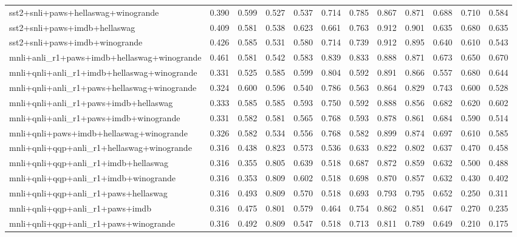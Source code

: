 \begin{table}[t]
\begin{tabular}{lrrrrrrrrrrr}
    sst2+snli+paws+hellaswag+winogrande & 0.390 & 0.599 & 0.527 & 0.537 & 0.714 & 0.785 & 0.867 & 0.871 & 0.688 & 0.710 & 0.584 \\
    sst2+snli+paws+imdb+hellaswag & 0.409 & 0.581 & 0.538 & 0.623 & 0.661 & 0.763 & 0.912 & 0.901 & 0.635 & 0.680 & 0.635 \\
    sst2+snli+paws+imdb+winogrande & 0.426 & 0.585 & 0.531 & 0.580 & 0.714 & 0.739 & 0.912 & 0.895 & 0.640 & 0.610 & 0.543 \\
    \addlinespace
    mnli+anli\_r1+paws+imdb+hellaswag+winogrande & 0.461 & 0.581 & 0.542 & 0.583 & 0.839 & 0.833 & 0.888 & 0.871 & 0.673 & 0.650 & 0.670 \\
    mnli+qnli+anli\_r1+imdb+hellaswag+winogrande & 0.331 & 0.525 & 0.585 & 0.599 & 0.804 & 0.592 & 0.891 & 0.866 & 0.557 & 0.680 & 0.644 \\
    mnli+qnli+anli\_r1+paws+hellaswag+winogrande & 0.324 & 0.600 & 0.596 & 0.540 & 0.786 & 0.563 & 0.864 & 0.829 & 0.743 & 0.600 & 0.528 \\
    mnli+qnli+anli\_r1+paws+imdb+hellaswag & 0.333 & 0.585 & 0.585 & 0.593 & 0.750 & 0.592 & 0.888 & 0.856 & 0.682 & 0.620 & 0.602 \\
    mnli+qnli+anli\_r1+paws+imdb+winogrande & 0.331 & 0.582 & 0.581 & 0.565 & 0.768 & 0.593 & 0.878 & 0.861 & 0.684 & 0.590 & 0.514 \\
    mnli+qnli+paws+imdb+hellaswag+winogrande & 0.326 & 0.582 & 0.534 & 0.556 & 0.768 & 0.582 & 0.899 & 0.874 & 0.697 & 0.610 & 0.585 \\
    mnli+qnli+qqp+anli\_r1+hellaswag+winogrande & 0.316 & 0.438 & 0.823 & 0.573 & 0.536 & 0.633 & 0.822 & 0.802 & 0.637 & 0.470 & 0.458 \\
    mnli+qnli+qqp+anli\_r1+imdb+hellaswag & 0.316 & 0.355 & 0.805 & 0.639 & 0.518 & 0.687 & 0.872 & 0.859 & 0.632 & 0.500 & 0.488 \\
    mnli+qnli+qqp+anli\_r1+imdb+winogrande & 0.316 & 0.353 & 0.809 & 0.602 & 0.518 & 0.698 & 0.870 & 0.857 & 0.632 & 0.430 & 0.402 \\
    mnli+qnli+qqp+anli\_r1+paws+hellaswag & 0.316 & 0.493 & 0.809 & 0.570 & 0.518 & 0.693 & 0.793 & 0.795 & 0.652 & 0.250 & 0.311 \\
    mnli+qnli+qqp+anli\_r1+paws+imdb & 0.316 & 0.475 & 0.801 & 0.579 & 0.464 & 0.754 & 0.862 & 0.851 & 0.647 & 0.270 & 0.235 \\
    mnli+qnli+qqp+anli\_r1+paws+winogrande & 0.316 & 0.492 & 0.809 & 0.547 & 0.518 & 0.713 & 0.811 & 0.789 & 0.649 & 0.210 & 0.175 \\

\end{tabular}
\end{table}
